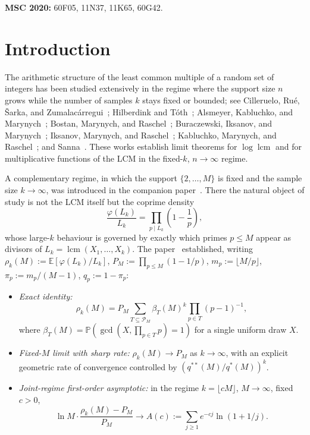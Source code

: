 \documentclass[11pt]{article}
\theoremstyle{remark}
\newcommand{\lcm}{\operatorname{lcm}}
\newcommand{\gcdop}{\operatorname{gcd}}
\newcommand{\PP}{\mathbb{P}}
\newcommand{\EE}{\mathbb{E}}
\newcommand{\PM}{\mathcal{P}_M}
\begin{document}
\noindent\textbf{MSC 2020:} 60F05, 11N37, 11K65, 60G42.

\section{Introduction}\label{sec:intro}

The arithmetic structure of the least common multiple of a random set of integers has been studied extensively in the regime where the support size $n$ grows while the number of samples $k$ stays fixed or bounded; see Cilleruelo, Ru\'e, \v{S}arka, and Zumalac\'arregui~\cite{CRSZ}; Hilberdink and T\'oth~\cite{HT}; Alsmeyer, Kabluchko, and Marynych~\cite{AKM}; Bostan, Marynych, and Raschel~\cite{BMR}; Buraczewski, Iksanov, and Marynych~\cite{BIM}; Iksanov, Marynych, and Raschel~\cite{IMR}; Kabluchko, Marynych, and Raschel~\cite{KMR}; and Sanna~\cite{Sanna}. These works establish limit theorems for $\log \lcm$ and for multiplicative functions of the LCM in the fixed-$k$, $n \to \infty$ regime.

A complementary regime, in which the support $\{2, \ldots, M\}$ is fixed and the sample size $k \to \infty$, was introduced in the companion paper~\cite{wakid1}. There the natural object of study is not the LCM itself but the coprime density
\[
\frac{\varphi(L_k)}{L_k} = \prod_{p \mid L_k}\!\left(1 - \frac{1}{p}\right),
\]
whose large-$k$ behaviour is governed by exactly which primes $p \leq M$ appear as divisors of $L_k = \lcm(X_1, \ldots, X_k)$. The paper~\cite{wakid1} established, writing $\rho_k(M) := \EE[\varphi(L_k)/L_k]$, $P_M := \prod_{p \leq M}(1 - 1/p)$, $m_p := \lfloor M/p \rfloor$, $\pi_p := m_p/(M-1)$, $q_p := 1 - \pi_p$:
\begin{itemize}[leftmargin=2em]\itemsep=2pt
\item \emph{Exact identity:}
\[
\rho_k(M)=P_M\sum_{T\subseteq\PM}\beta_T(M)^k
\prod_{p\in T}(p-1)^{-1},
\]
where $\beta_T(M)=\PP(\gcdop(X,\prod_{p\in T}p)=1)$ for a single uniform draw $X$.
\item \emph{Fixed-$M$ limit with sharp rate:} $\rho_k(M) \to P_M$ as $k \to \infty$, with an explicit geometric rate of convergence controlled by $(q^{**}(M)/q^*(M))^k$.
\item \emph{Joint-regime first-order asymptotic:} in the regime $k = \lfloor cM \rfloor$, $M \to \infty$, fixed $c > 0$,
\[
\ln M \cdot \frac{\rho_k(M) - P_M}{P_M} \longrightarrow A(c) := \sum_{j \geq 1} e^{-cj}\ln(1 + 1/j).
\]
\end{itemize}
\end{document}
